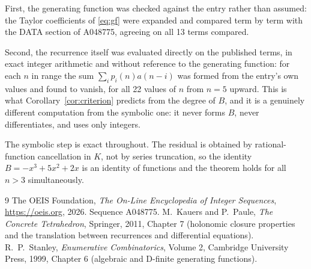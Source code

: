 \documentclass[11pt,a4paper]{article}
\theoremstyle{plain}
\theoremstyle{definition}
\begin{document}
First, the generating function was checked against the entry rather than assumed: the
Taylor coefficients of \eqref{eq:gf} were expanded and compared term by term with the DATA
section of A048775, agreeing on all 13 terms compared.

Second, the recurrence itself was evaluated directly on the published terms, in exact
integer arithmetic and without reference to the generating function: for each $n$ in range
the sum $\sum_{i}p_{i}(n)a(n-i)$ was formed from the entry's own values and found to
vanish, for all 22 values of $n$ from $n=5$ upward. This is what
Corollary~\ref{cor:criterion} predicts from the degree of $B$, and it is a genuinely
different computation from the symbolic one: it never forms $B$, never differentiates, and
uses only integers.

The symbolic step is exact throughout. The residual is obtained by rational-function
cancellation in $K$, not by series truncation, so the identity $B=- x^{3} + 5 x^{2} + 2 x$ is an
identity of functions and the theorem holds for all $n>3$ simultaneously.

\begin{thebibliography}{9}
 The OEIS Foundation, \emph{The On-Line Encyclopedia of Integer Sequences},
\url{https://oeis.org}, 2026. Sequence A048775.
 M.~Kauers and P.~Paule, \emph{The Concrete Tetrahedron}, Springer, 2011,
Chapter 7 (holonomic closure properties and the translation between recurrences and
differential equations).
 R.~P.~Stanley, \emph{Enumerative Combinatorics}, Volume 2, Cambridge
University Press, 1999, Chapter 6 (algebraic and D-finite generating functions).
\end{thebibliography}
\end{document}
